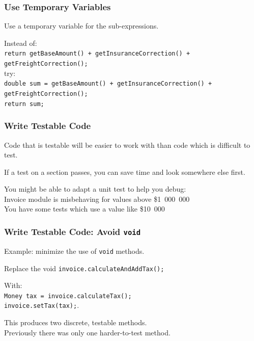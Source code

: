 \begin{frame}
\frametitle{Use Temporary Variables}
\begin{changemargin}{1cm}
Use a temporary variable for the sub-expressions.

Instead of:\\
\texttt{return getBaseAmount() + getInsuranceCorrection() + getFreightCorrection();}\\
try:\\
\texttt{double sum = getBaseAmount() + getInsuranceCorrection() + getFreightCorrection();\\ return sum;}\\


\end{changemargin}
\end{frame}

\begin{frame}
\frametitle{Write Testable Code}
\begin{changemargin}{1cm}
Code that is testable will be easier to work with than code which is difficult to test.

If a test on a section passes, you can save time and look somewhere else first.

You might be able to adapt a unit test to help you debug:\\
\quad Invoice module is misbehaving for values above \$1~000~000 \\
\quad You have some tests which use a value like \$10~000 
\end{changemargin}
\end{frame}

\begin{frame}
\frametitle{Write Testable Code: Avoid \texttt{void}}
\begin{changemargin}{1cm}
Example: minimize the use of \texttt{void} methods.

Replace the void \texttt{invoice.calculateAndAddTax();}

With: \\
\quad \texttt{Money tax = invoice.calculateTax();} \\
\quad \texttt{invoice.setTax(tax);}. 

This produces two discrete, testable methods.\\
\quad Previously there was only one harder-to-test method.


\end{changemargin}
\end{frame}

